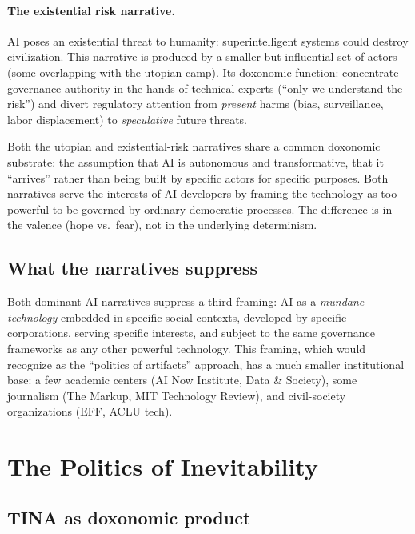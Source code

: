 \paragraph{The existential risk narrative.}
AI poses an existential threat to humanity: superintelligent systems could destroy civilization.
This narrative is produced by a smaller but influential set of actors (some overlapping with the utopian camp).
Its doxonomic function: concentrate governance authority in the hands of technical experts (``only we understand the risk'') and divert regulatory attention from \emph{present} harms (bias, surveillance, labor displacement) to \emph{speculative} future threats.

\begin{remark}
\label{prop:ai-narratives}
Both the utopian and existential-risk narratives share a common doxonomic substrate: the assumption that AI is autonomous and transformative, that it ``arrives'' rather than being built by specific actors for specific purposes.
Both narratives serve the interests of AI developers by framing the technology as too powerful to be governed by ordinary democratic processes.
The difference is in the valence (hope vs.\ fear), not in the underlying determinism.
\end{remark}

\subsection{What the narratives suppress}

Both dominant AI narratives suppress a third framing: AI as a \emph{mundane technology} embedded in specific social contexts, developed by specific corporations, serving specific interests, and subject to the same governance frameworks as any other powerful technology.
This framing, which \textcite{winner1986} would recognize as the ``politics of artifacts'' approach, has a much smaller institutional base: a few academic centers (AI Now Institute, Data \& Society), some journalism (The Markup, MIT Technology Review), and civil-society organizations (EFF, ACLU tech).

\section{The Politics of Inevitability}
\label{sec:ch28-inevitability}

\subsection{TINA as doxonomic product}


